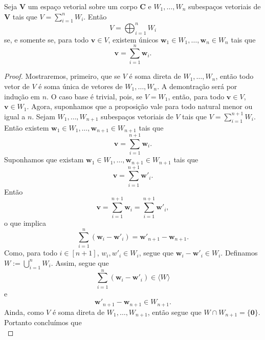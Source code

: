 \begin{prop}
	Seja $\bm V$ um espaço vetorial sobre um corpo $\bm C$ e $W_1,\ldots,W_n$ subespaços vetoriais de $\bm V$ tais que $V = \sum_{i=1}^n W_i$. Então
	\begin{equation*}
	V=\bigoplus_{i=1}^n W_i
	\end{equation*}
se, e somente se, para todo $\bm v \in V$, existem únicos $\bm w_1 \in W_1,\ldots,\bm w_n \in W_n$ tais que
	\begin{equation*}
	\bm v = \sum_{i=1}^n \bm w_i.
	\end{equation*}
\end{prop}
\begin{proof}
	Mostraremos, primeiro, que se $V$ é soma direta de $W_1,\ldots,W_n$, então todo vetor de $V$ é soma única de vetores de $W_1,\ldots,W_n$. A demontração será por indução em $n$. O caso base é trivial, pois, se $V=W_1$, então, para todo $\bm v \in V$, $\bm v \in W_1$. Agora, suponhamos que a proposição vale para todo natural menor ou igual a $n$. Sejam $W_1,\ldots,W_{n+1}$ subespaços vetoriais de $V$ tais que $V = \sum_{i=1}^{n+1} W_i$. Então existem $\bm w_1 \in W_1,\ldots,\bm w_{n+1} \in W_{n+1}$ tais que
	\begin{equation*}
	\bm v = \sum_{i=1}^{n+1} \bm w_i.
	\end{equation*}
Suponhamos que existam $\bm w_1 \in W_1,\ldots,\bm w_{n+1} \in W_{n+1}$ tais que
	\begin{equation*}
	\bm v = \sum_{i=1}^{n+1} \bm w'_i.
	\end{equation*}
Então
	\begin{equation*}
	\bm v = \sum_{i=1}^{n+1} \bm w_i = \sum_{i=1}^{n+1} \bm w'_i,
	\end{equation*}
o que implica
	\begin{equation*}
	\sum_{i=1}^n (\bm w_i - \bm w'_i) = \bm w'_{n+1} - \bm w_{n+1}.
	\end{equation*}
Como, para todo $i \in [n+1]$, $w_i,w'_i \in W_i$, segue que $\bm w_i - \bm w'_i \in W_i$. Definamos $W := \bigcup_{i=1}^n W_i$. Assim, segue que
	\begin{equation*}
	\sum_{i=1}^n (\bm w_i - \bm w'_i) \in \langle W \rangle
	\end{equation*}
e
	\begin{equation*}
	\bm w'_{n+1} - \bm w_{n+1} \in W_{n+1}.
	\end{equation*}
Ainda, como $V$ é soma direta de $W_1,\ldots,W_{n+1}$, então segue que $W \cap W_{n+1} = \{\bm 0\}$. Portanto concluímos que
	\begin{equation*}

\end{equation*}
\end{proof}
